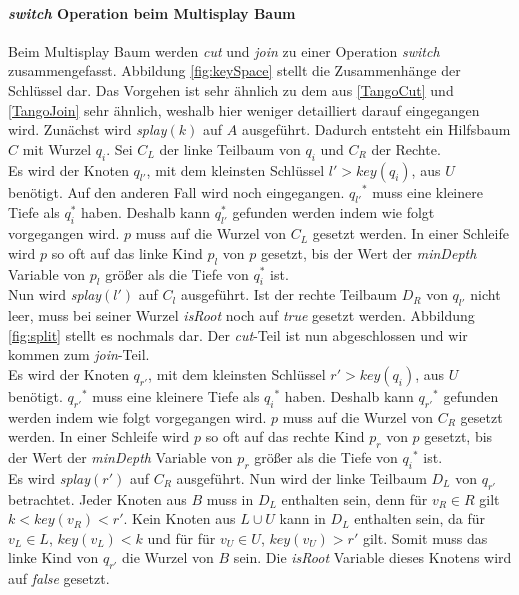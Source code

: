 \documentclass[a4paper,12pt]{article}
\begin{document}
\paragraph{\textit{switch} Operation beim Multisplay Baum}
Beim Multisplay Baum werden \textit{cut} und \textit{join} zu einer Operation \textit{switch} zusammengefasst. Abbildung \ref{fig:keySpace} stellt die Zusammenhänge der Schlüssel dar. Das Vorgehen ist sehr ähnlich zu dem aus \ref{TangoCut} und  \ref{TangoJoin} sehr ähnlich, weshalb hier weniger detailliert darauf eingegangen wird.
Zunächst wird \textit{splay}$\left(k\right)$ auf $A$ ausgeführt. Dadurch entsteht ein Hilfsbaum $C$ mit Wurzel $q_i$. Sei $C_L$ der linke Teilbaum von $q_i$ und $C_R$ der Rechte.\\
Es wird der Knoten $q_{l'}$, mit dem kleinsten Schlüssel $l' > \textit{key}\left(q_i\right)$, aus $U$ benötigt. Auf den anderen Fall wird noch eingegangen. ${q_{l'}}^*$ muss eine kleinere Tiefe als  $q_i^*$ haben. Deshalb kann $q_{l'}^*$ gefunden werden indem  wie folgt vorgegangen wird. $p$ muss auf die Wurzel von $C_L$ gesetzt werden. In einer Schleife wird $p$ so oft auf das linke Kind $p_l$ von $p$ gesetzt, bis der Wert der \textit{minDepth} Variable von $p_l$ größer als die Tiefe von $q_i^*$  ist.\\
Nun wird \textit{splay}$\left(l'\right)$ auf $C_l$ ausgeführt. Ist der rechte Teilbaum $D_R$ von $q_{l'}$ nicht leer,  muss bei seiner Wurzel \textit{isRoot} noch auf \textit{true} gesetzt werden. Abbildung \ref{fig:split} stellt es nochmals dar. Der \textit{cut}-Teil ist nun abgeschlossen und wir kommen zum \textit{join}-Teil. \\
Es wird der Knoten $q_{r'}$, mit dem kleinsten Schlüssel $r' > \textit{key}\left(q_i\right)$, aus $U$ benötigt. ${q_{r'}}^*$ muss eine kleinere Tiefe als  ${q_i}^*$ haben. Deshalb kann ${q_{r'}}^*$ gefunden werden indem  wie folgt vorgegangen wird. $p$ muss auf die Wurzel von $C_R$ gesetzt werden. In einer Schleife wird $p$ so oft auf das rechte Kind $p_r$ von $p$ gesetzt, bis der Wert der \textit{minDepth} Variable von $p_r$ größer als die Tiefe von ${q_i}^*$  ist.\\
Es wird \textit{splay}$\left(r'\right)$ auf $C_R$ ausgeführt. Nun wird der linke Teilbaum $D_L$ von $q_{r'}$ betrachtet. Jeder Knoten aus $B$ muss in $D_L$ enthalten sein, denn für $v_R \in R$ gilt $k < \mathit{key}\left(v_R\right) < r'$. Kein Knoten aus $L \cup U$ kann in $D_L$ enthalten sein, da für $v_L \in  L$,  $ \mathit{key}\left(v_L\right) < k$ und für  für $v_U \in  U$,  $ \mathit{key}\left(v_U\right) > r'$ gilt. Somit muss das linke Kind von $q_{r'}$ die Wurzel von $B$ sein. Die \textit{isRoot} Variable dieses Knotens wird auf \textit{false} gesetzt.\\
\end{document}
